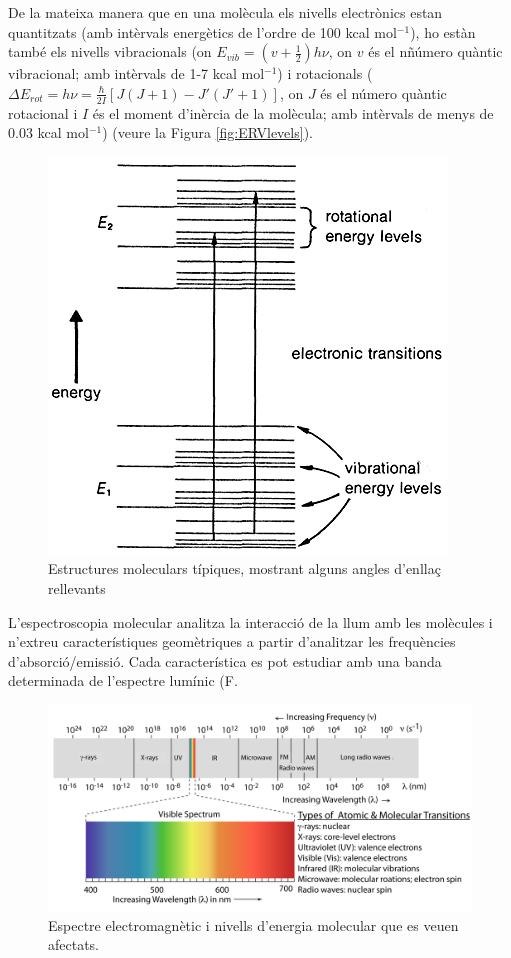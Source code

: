 De la mateixa manera que en una molècula els nivells electrònics estan quantitzats (amb intèrvals energètics de l'ordre de 100 kcal mol$^{-1}$), ho estàn també els nivells vibracionals (on $E_{vib}=(v+\frac{1}{2})h\nu$, on $v$ és el nñúmero quàntic vibracional; amb intèrvals de 1-7 kcal mol$^{-1}$) i rotacionals ($\Delta E_{rot}=h \nu = \frac{\hbar}{2I}[J(J+1)-J'(J'+1)]$, on $J$ és el número quàntic rotacional i $I$ és el moment d'inèrcia de la molècula; amb intèrvals de menys de 0.03 kcal mol$^{-1}$) (veure la Figura \ref{fig:ERVlevels}).
\begin{figure}[h]
\centering
\includegraphics[scale=0.3]{figures/EVRlevels.png}
\caption{Estructures moleculars típiques, mostrant alguns angles d'enllaç rellevants}
\label{fig:EVRlevels}
\end{figure}

L'espectroscopia molecular analitza la interacció de la llum amb les molècules i n'extreu característiques geomètriques a partir d'analitzar les frequències d'absorció/emissió.
Cada característica es pot estudiar amb una banda determinada de l'espectre lumínic (F.
\begin{figure}[h]
\centering
\includegraphics[scale=0.5]{figures/MolSpect.png}
\caption{Espectre electromagnètic i nivells d'energia molecular que es veuen afectats.}
\label{fig:MolSpect}
\end{figure}

